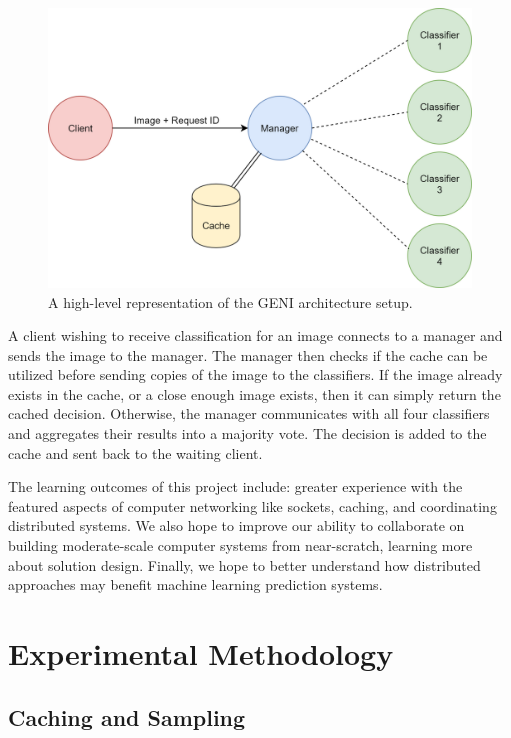 \documentclass[11pt]{article}
\begin{document}
\begin{figure}
    \centering
    \includegraphics[scale=0.12]{networksArchitecture.png}
    \caption{A high-level representation of the GENI architecture setup.}
    \label{fig:architecture}
\end{figure}

A client wishing to receive classification for an image connects to a manager and sends the image to the manager. The manager then checks if the cache can be utilized before sending copies of the image to the classifiers. If the image already exists in the cache, or a close enough image exists, then it can simply return the cached decision. Otherwise, the manager communicates with all four classifiers and aggregates their results into a majority vote. The decision is added to the cache and sent back to the waiting client.

The learning outcomes of this project include: greater experience with the featured aspects of computer networking like sockets, caching, and coordinating distributed systems.
We also hope to improve our ability to collaborate on building moderate-scale computer systems from near-scratch, learning more about solution design.
Finally, we hope to better understand how distributed approaches may benefit machine learning prediction systems.

\section{Experimental Methodology}

\subsection{Caching and Sampling}
\end{document}
